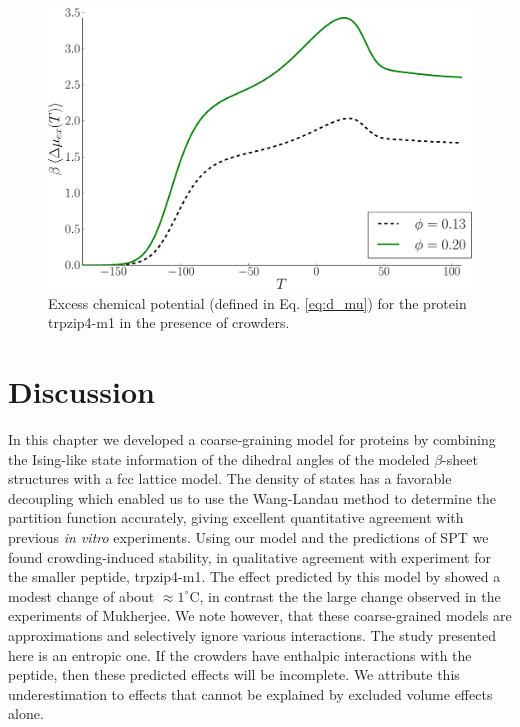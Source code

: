 \begin{figure}[ht]
\includegraphics[width=\figurewidthSINGLE]{tex/WL_crowding_paper/PLOT_trpzip_change_chem_pot-crop.pdf}
\caption{Excess chemical potential (defined in Eq. \ref{eq:d_mu}) for the protein trpzip4-m1 in the presence of crowders.}
\label{fig:trpzip_chem_change_plot}
\end{figure}



\section{Discussion \label{sec:conclusion}}
In this chapter we developed a coarse-graining model for proteins by combining the Ising-like state information of the dihedral angles of the modeled $\beta$-sheet structures with a fcc lattice model. The density of states has a favorable decoupling which enabled us to use the Wang-Landau method to determine the partition function accurately, giving excellent quantitative agreement with previous \textit{in vitro} experiments. Using our model and the predictions of SPT we found crowding-induced stability, in qualitative agreement with experiment for the smaller peptide, trpzip4-m1. The effect predicted by this model by showed a modest change of about $\approx 1^\circ$C, in contrast the the large change observed in the experiments of Mukherjee.\cite{mukherjee_effect_2009} We note however, that these coarse-grained models are approximations and selectively ignore various interactions. The study presented here is an entropic one. If the crowders have enthalpic interactions with the peptide, then these predicted effects will be incomplete. We attribute this underestimation to effects that cannot be explained by excluded volume effects alone.

